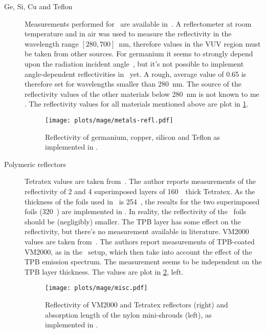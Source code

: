 \begin{description}
  \item[Ge, Si, Cu and Teflon] Measurements performed for \gerda\ are available
    in~\cite{Wegmann2017}.  A reflectometer at room temperature and in air was used to
    measure the reflectivity in the wavelength range $[280, 700]$~nm, therefore values in
    the VUV region must be taken from other sources. For germanium it seems to strongly
    depend upon the radiation incident angle~\cite{Marton1967}, but it's not possible to
    implement angle-dependent reflectivities in \geant\ yet. A rough, average value of
    0.65 is therefore set for wavelengths smaller than 280~nm. The source of the
    reflectivity values of the other materials below 280~nm is not known to me
    . The reflectivity values for all materials mentioned above are plot in
    \cref{fig:bkg:lar:ph2:mage:metals-refl}.

    \begin{figure}
      \centering
      \texttt{[image: plots/mage/metals-refl.pdf]}
      \caption{%
        Reflectivity of germanium, copper, silicon and Teflon as implemented in \mage.
      }\label{fig:bkg:lar:ph2:mage:metals-refl}
    \end{figure}

  \item[Polymeric reflectors] Tetratex\reg{} values are taken from~\cite{Janecek2012}. The
    author reports measurements of the reflectivity of 2 and 4 superimposed layers of
    160~\mum\ thick Tetratex\reg{}. As the thickness of the foils used in \gerda\ is
    254~\mum, the results for the two superimposed foils (320~\mum) are implemented in
    \mage. In reality, the reflectivity of the \gerda\ foils should be (negligibly)
    smaller. The TPB layer has some effect on the reflectivity, but there's no measurement
    available in literature.  VM2000 values are taken from~\cite{Francini2013}.  The
    authors report measurements of TPB-coated VM2000, as in the \gerda\ setup, which then
    take into account the effect of the TPB emission spectrum. The measurement seems to be
    independent on the TPB layer thickness. The values are plot in
    \cref{fig:bkg:lar:ph2:mage:misc}, left.

    \begin{figure}
      \centering
      \texttt{[image: plots/mage/misc.pdf]}
      \caption{%
        Reflectivity of VM2000 and Tetratex\reg{} reflectors (right) and absorption length
        of the nylon mini-shrouds (left), as implemented in \mage.
      }\label{fig:bkg:lar:ph2:mage:misc}
    \end{figure}

\end{description}


